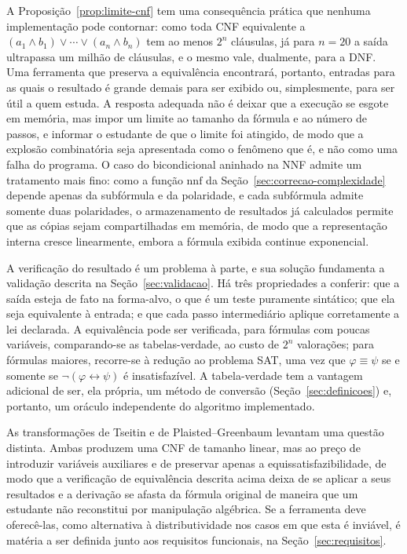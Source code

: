 \documentclass[12pt,a4paper,oneside]{report}
\theoremstyle{tituloplain}
\theoremstyle{titulodef}
\begin{document}
A Proposição~\ref{prop:limite-cnf} tem uma consequência prática que nenhuma implementação pode contornar: como toda CNF equivalente a $(a_1\wedge b_1)\vee\cdots\vee(a_n\wedge b_n)$ tem ao menos $2^n$ cláusulas, já para $n=20$ a saída ultrapassa um milhão de cláusulas, e o mesmo vale, dualmente, para a DNF. Uma ferramenta que preserva a equivalência encontrará, portanto, entradas para as quais o resultado é grande demais para ser exibido ou, simplesmente, para ser útil a quem estuda. A resposta adequada não é deixar que a execução se esgote em memória, mas impor um limite ao tamanho da fórmula e ao número de passos, e informar o estudante de que o limite foi atingido, de modo que a explosão combinatória seja apresentada como o fenômeno que é, e não como uma falha do programa. O caso do bicondicional aninhado na NNF admite um tratamento mais fino: como a função $\mathrm{nnf}$ da Seção~\ref{sec:correcao-complexidade} depende apenas da subfórmula e da polaridade, e cada subfórmula admite somente duas polaridades, o armazenamento de resultados já calculados permite que as cópias sejam compartilhadas em memória, de modo que a representação interna cresce linearmente, embora a fórmula exibida continue exponencial.

A verificação do resultado é um problema à parte, e sua solução fundamenta a validação descrita na Seção~\ref{sec:validacao}. Há três propriedades a conferir: que a saída esteja de fato na forma-alvo, o que é um teste puramente sintático; que ela seja equivalente à entrada; e que cada passo intermediário aplique corretamente a lei declarada. A equivalência pode ser verificada, para fórmulas com poucas variáveis, comparando-se as tabelas-verdade, ao custo de $2^n$ valorações; para fórmulas maiores, recorre-se à redução ao problema SAT, uma vez que $\varphi\equiv\psi$ se e somente se $\neg(\varphi\leftrightarrow\psi)$ é insatisfazível. A tabela-verdade tem a vantagem adicional de ser, ela própria, um método de conversão (Seção~\ref{sec:definicoes}) e, portanto, um oráculo independente do algoritmo implementado.

As transformações de Tseitin e de Plaisted--Greenbaum levantam uma questão distinta. Ambas produzem uma CNF de tamanho linear, mas ao preço de introduzir variáveis auxiliares e de preservar apenas a equissatisfazibilidade, de modo que a verificação de equivalência descrita acima deixa de se aplicar a seus resultados e a derivação se afasta da fórmula original de maneira que um estudante não reconstitui por manipulação algébrica. Se a ferramenta deve oferecê-las, como alternativa à distributividade nos casos em que esta é inviável, é matéria a ser definida junto aos requisitos funcionais, na Seção~\ref{sec:requisitos}.
\end{document}
